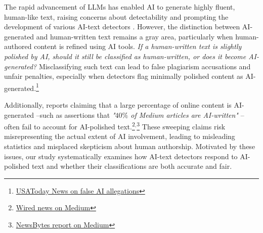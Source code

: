 





The rapid advancement of LLMs has enabled AI to generate highly fluent, human-like text, raising concerns about detectability and prompting the development of various AI-text detectors \citep{gehrmann2019gltr, mitchell2023detectgpt, hu2023radar}.
However, the distinction between AI-generated and human-written text remains a gray area, particularly when human-authored content is refined using AI tools. \textit{If a human-written text is slightly polished by AI, should it still be classified as human-written, or does it become AI-generated?} Misclassifying such text can lead to false plagiarism accusations and unfair penalties, especially when detectors flag minimally polished content as AI-generated.\footnote{\href{https://www.usatoday.com/story/life/health-wellness/2025/01/22/college-students-ai-allegations-mental-health/77723194007/}{USAToday News on false AI allegations}}

Additionally, reports claiming that a large percentage of online content is AI-generated --such as assertions that \textit{"$40\%$ of Medium articles are AI-written"} -- often fail to account for AI-polished text.\footnote{\href{https://tinyurl.com/3jxktwkr}{Wired news on Medium}}$^{,}$\footnote{\href{https://tinyurl.com/594ydhaj}{NewsBytes report on Medium}} These sweeping claims risk misrepresenting the actual extent of AI involvement, leading to misleading statistics and misplaced skepticism about human authorship. Motivated by these issues, our study systematically examines how AI-text detectors respond to AI-polished text and whether their classifications are both accurate and fair.

